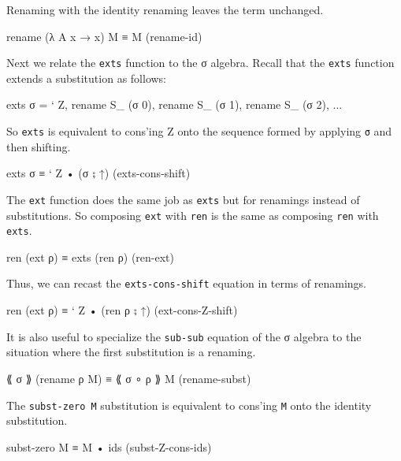 Renaming with the identity renaming leaves the term unchanged.

\begin{myDisplay}
rename (λ {A} x → x) M ≡ M             (rename-id)
\end{myDisplay}

Next we relate the \texttt{exts} function to the σ algebra. Recall that
the \texttt{exts} function extends a substitution as follows:

\begin{myDisplay}
exts σ = ` Z, rename S_ (σ 0), rename S_ (σ 1), rename S_ (σ 2), ...
\end{myDisplay}

So \texttt{exts} is equivalent to cons'ing Z onto the sequence formed by
applying \texttt{σ} and then shifting.

\begin{myDisplay}
exts σ ≡ ` Z • (σ ⨟ ↑)                (exts-cons-shift)
\end{myDisplay}

The \texttt{ext} function does the same job as \texttt{exts} but for
renamings instead of substitutions. So composing \texttt{ext} with
\texttt{ren} is the same as composing \texttt{ren} with \texttt{exts}.

\begin{myDisplay}
ren (ext ρ) ≡ exts (ren ρ)            (ren-ext)
\end{myDisplay}

Thus, we can recast the \texttt{exts-cons-shift} equation in terms of
renamings.

\begin{myDisplay}
ren (ext ρ) ≡ ` Z • (ren ρ ⨟ ↑)       (ext-cons-Z-shift)
\end{myDisplay}

It is also useful to specialize the \texttt{sub-sub} equation of the σ
algebra to the situation where the first substitution is a renaming.

\begin{myDisplay}
⟪ σ ⟫ (rename ρ M) ≡ ⟪ σ ∘ ρ ⟫ M       (rename-subst)
\end{myDisplay}

The \texttt{subst-zero\ M} substitution is equivalent to cons'ing
\texttt{M} onto the identity substitution.

\begin{myDisplay}
subst-zero M ≡ M • ids                (subst-Z-cons-ids)
\end{myDisplay}


